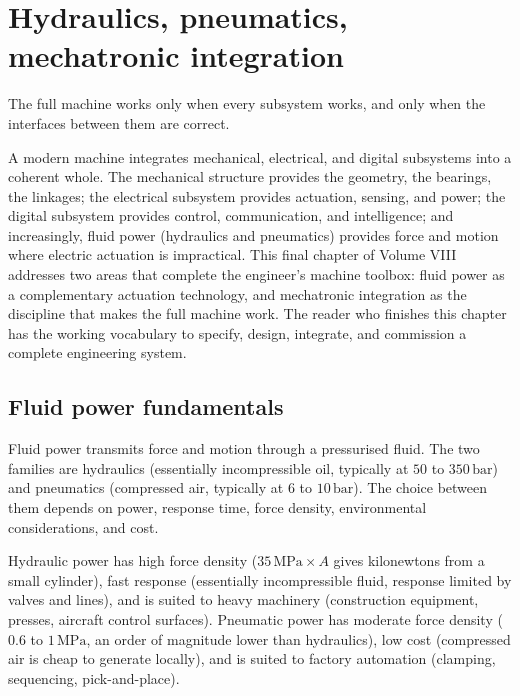 \chapter{Hydraulics, pneumatics, mechatronic integration}
\label{vol08:ch14}

\epigraph{The full machine works only when every subsystem works, and only when the interfaces between them are correct.}{}


\noindent
A modern machine integrates mechanical, electrical, and digital subsystems into a coherent whole. The mechanical structure provides the geometry, the bearings, the linkages; the electrical subsystem provides actuation, sensing, and power; the digital subsystem provides control, communication, and intelligence; and increasingly, fluid power (hydraulics and pneumatics) provides force and motion where electric actuation is impractical. This final chapter of Volume VIII addresses two areas that complete the engineer's machine toolbox: fluid power as a complementary actuation technology, and mechatronic integration as the discipline that makes the full machine work. The reader who finishes this chapter has the working vocabulary to specify, design, integrate, and commission a complete engineering system.

\section{Fluid power fundamentals}

Fluid power transmits force and motion through a pressurised fluid. The two families are hydraulics (essentially incompressible oil, typically at $50$ to $350\,\text{bar}$) and pneumatics (compressed air, typically at $6$ to $10\,\text{bar}$). The choice between them depends on power, response time, force density, environmental considerations, and cost.

Hydraulic power has high force density ($35\,\text{MPa} \times A$ gives kilonewtons from a small cylinder), fast response (essentially incompressible fluid, response limited by valves and lines), and is suited to heavy machinery (construction equipment, presses, aircraft control surfaces). Pneumatic power has moderate force density ($0.6$ to $1\,\text{MPa}$, an order of magnitude lower than hydraulics), low cost (compressed air is cheap to generate locally), and is suited to factory automation (clamping, sequencing, pick-and-place).

